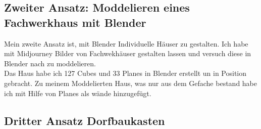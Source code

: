 \subsection{Zweiter Ansatz: Moddelieren eines Fachwerkhaus mit Blender}
Mein zweite Ansatz ist, mit Blender Individuelle Häuser zu gestalten. Ich habe mit Midjourney Bilder von Fachwekhäuser gestalten lassen und versuch diese in Blender nach zu moddelieren.
\\
Das Haus habe ich 127 Cubes und 33 Planes in Blender erstellt un in Position gebracht. Zu meinem Moddelierten Haus, was nur aus dem Gefache bestand habe ich mit Hilfe von Planes als wände hinzugefügt.

\subsection{Dritter Ansatz Dorfbaukasten}%

